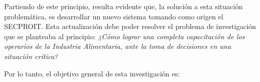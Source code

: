 
Partiendo de este principio, resulta evidente que, la solución a esta situación problemática, es desarrollar un nuevo sistema tomando como origen el SECPROIT.
Esta actualización debe poder resolver el problema de investigación que se planteaba al principio: 
\textsl{¿Cómo lograr una completa capacitación de los operarios de la Industria Alimentaria, ante la toma de decisiones en una situación crítica?}

Por lo tanto, el objetivo general de esta investigación es: 
